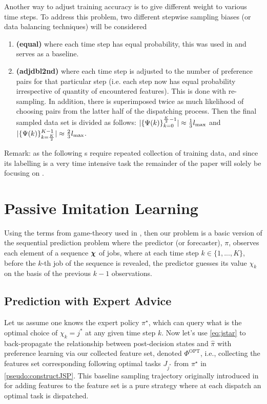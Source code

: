 \documentclass[twocolumn]{svjour3}
\begin{document}
Another way to adjust training accuracy is to give different weight to various 
time steps. To address this problem, two different stepwise sampling biases (or 
data balancing techniques) will be considered
\begin{enumerate}[after={{}}, leftmargin=*,
label={\textbf{Bias.\arabic*}}, ref={{Bias.\arabic*}}]
\item \label{bias:equal} \textbf{(equal)} where each time step has equal 
probability, this was used in \cite{InRu14,InRu15a} and serves as a baseline.
\item \label{bias:adjdbl2nd} \textbf{(adjdbl2nd)} where each time step is 
adjusted to the number of preference pairs for that particular step (i.e. 
each step now has equal probability irrespective of quantity of encountered 
features). This is done with re-sampling.
In addition, there is superimposed twice as much likelihood of 
choosing pairs from the latter half of the dispatching process. Then the 
final sampled data set is divided as follows:
$\lvert\{\Psi(k)\}_{k=0}^{\frac{K}{2}-1}\rvert \approx \frac{1}{3}l_{\max}$ and 
$\lvert\{\Psi(k)\}_{k=\frac{K}{2}}^{K-1}\rvert \approx \frac{2}{3}l_{\max}$.
\end{enumerate}

\noindent Remark: as the following s require 
repeated collection of training data, and since its labelling is a very 
time intensive task the remainder of the paper will solely be focusing 
on .

\section{Passive Imitation Learning}\label{sec:il:passive}
Using the terms from game-theory used in \cite{CesaBianchi06}, %
then our problem is a basic version of the sequential prediction problem where 
the predictor (or forecaster), $\pi$, observes each element of a sequence 
$\bm \chi$ of jobs, where at each time step $k \in \{1,...,K\}$, before the 
$k$-th job of the sequence is revealed, the predictor guesses its value 
$\chi_k$ on the basis of the previous $k-1$ observations. 

\subsection{Prediction with Expert Advice}\label{sec:expertPolicy}
Let us assume one knows the expert policy $\pi^\star$, which can query what 
is the optimal choice of $\chi_k={j^*}$ at any given time step $k$. 
Now let's use \cref{eq:jstar} to back-propagate the relationship between 
post-decision states and $\hat{\pi}$ with preference learning via our collected 
feature set, denoted $\Phi^\text{OPT}$, i.e., collecting the features set 
corresponding following optimal tasks $J_{j^*}$ from $\pi^\star$ in 
\cref{pseudo:constructJSP}.
This baseline sampling trajectory originally introduced in \cite{InRu11a} for 
adding features to the feature set is a pure strategy where at each dispatch an 
optimal task is dispatched.
\end{document}
